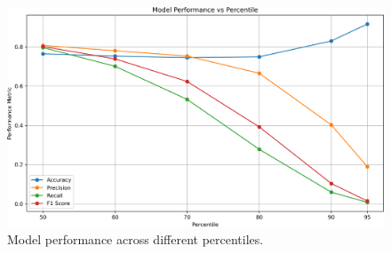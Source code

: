 \documentclass[8pt,a4paper]{article}
\begin{document}
\begin{figure}[H]
    \centering
    \includegraphics[width=\textwidth]{./performance_vs_percentile.png}
    \caption{Model performance across different percentiles.}
    \label{fig:perc}
\end{figure}
\end{document}
